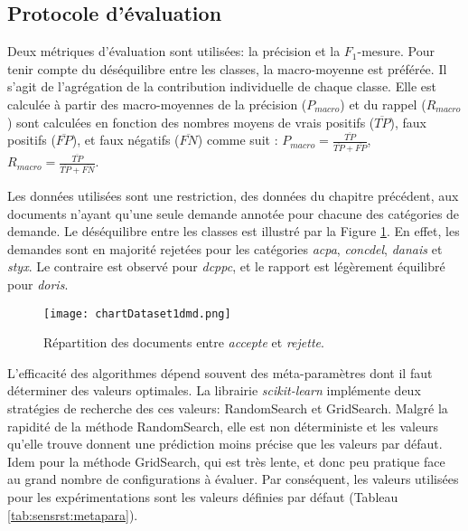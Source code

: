 
\subsection{Protocole d'évaluation}
Deux métriques d'évaluation sont utilisées: la précision et la $F_1$-mesure. Pour tenir compte du déséquilibre entre les classes, la macro-moyenne est préférée. Il s'agit de l'agrégation de la contribution individuelle de chaque classe. 
Elle est calculée à partir des macro-moyennes de la précision ($P_{macro}$) et du rappel ($R_{macro}$) sont calculées en fonction des nombres moyens de vrais positifs ($\overline{TP}$), faux positifs ($\overline{FP}$), et faux négatifs ($\overline{FN}$) comme suit \citep{van2013macromicroeval}:
$P_{macro} = \frac{\overline{TP}}{\overline{TP} + \overline{FP}}$, $R_{macro} = \frac{\overline{TP}}{\overline{TP} + \overline{FN}}$.


Les données utilisées sont une restriction, des données du chapitre précédent, aux documents n'ayant qu'une seule demande annotée pour chacune des catégories de demande. Le déséquilibre entre les classes est illustré par la Figure \ref{fig:sensresultat:stat-1dmd}. En effet, les demandes sont en majorité rejetées pour les catégories \textit{acpa}, \textit{concdel}, \textit{danais} et \textit{styx}. Le contraire est observé pour \textit{dcppc}, et le rapport est légèrement équilibré pour \textit{doris}.
\begin{figure}[htb]
	\centering
\texttt{[image: chartDataset1dmd.png]}
\caption{Répartition des documents entre \textit{accepte} et \textit{rejette}.}\label{fig:sensresultat:stat-1dmd}
\end{figure}

L'efficacité des algorithmes dépend souvent des méta-paramètres dont il faut déterminer des valeurs optimales. La librairie \textit{scikit-learn} \citep{Pedregosa2011sklearn} implémente deux stratégies de recherche des ces valeurs: RandomSearch et GridSearch. Malgré la rapidité de la méthode RandomSearch, elle est non déterministe et les valeurs qu'elle trouve donnent une prédiction moins précise que les valeurs par défaut. Idem pour la méthode GridSearch, qui est très lente, et donc peu pratique face au grand nombre de configurations à évaluer. Par conséquent, les valeurs utilisées pour les expérimentations sont les valeurs définies par défaut (Tableau \ref{tab:sensrst:metapara}).


